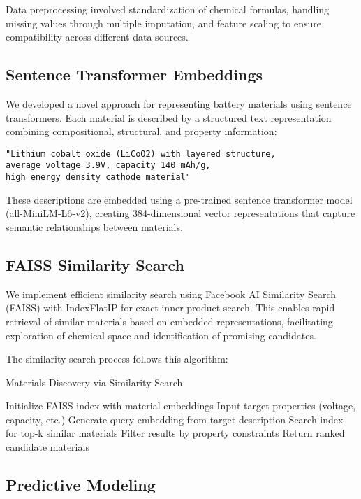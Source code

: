 \documentclass{article}
\begin{document}
Data preprocessing involved standardization of chemical formulas, handling missing values through multiple imputation, and feature scaling to ensure compatibility across different data sources.

\subsection{Sentence Transformer Embeddings}

We developed a novel approach for representing battery materials using sentence transformers. Each material is described by a structured text representation combining compositional, structural, and property information:

\begin{verbatim}
"Lithium cobalt oxide (LiCoO2) with layered structure,
average voltage 3.9V, capacity 140 mAh/g,
high energy density cathode material"
\end{verbatim}

These descriptions are embedded using a pre-trained sentence transformer model (all-MiniLM-L6-v2), creating 384-dimensional vector representations that capture semantic relationships between materials.

\subsection{FAISS Similarity Search}

We implement efficient similarity search using Facebook AI Similarity Search (FAISS) with IndexFlatIP for exact inner product search. This enables rapid retrieval of similar materials based on embedded representations, facilitating exploration of chemical space and identification of promising candidates.

The similarity search process follows this algorithm:

\begin{algorithm}
\caption{Materials Discovery via Similarity Search}
\begin{algorithmic}[1]
\STATE Initialize FAISS index with material embeddings
\STATE Input target properties (voltage, capacity, etc.)
\STATE Generate query embedding from target description
\STATE Search index for top-k similar materials
\STATE Filter results by property constraints
\STATE Return ranked candidate materials
\end{algorithmic}
\end{algorithm}

\subsection{Predictive Modeling}
\end{document}
